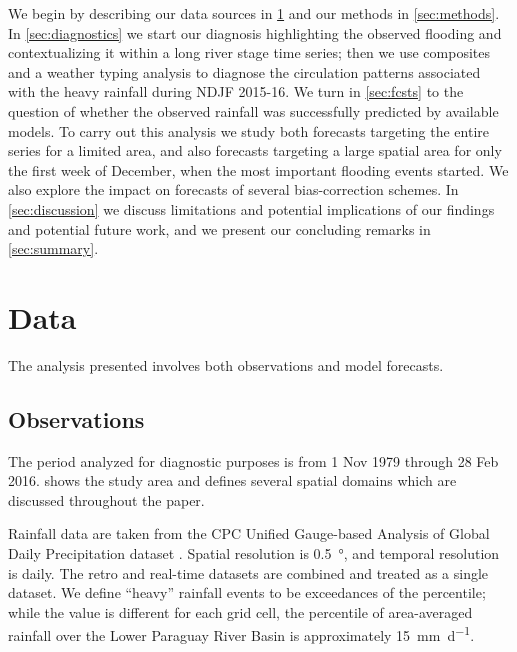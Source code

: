 \documentclass[twocol]{ametsoc}
\begin{document}
We begin by describing our data sources in \cref{sec:data} and our methods in \cref{sec:methods}.
In \cref{sec:diagnostics} we start our diagnosis highlighting the observed flooding and contextualizing it within a long river stage time series; then we use composites and a weather typing analysis to diagnose the circulation patterns associated with the heavy rainfall during NDJF 2015-16. We turn in \cref{sec:fcsts} to the question of whether the observed rainfall was successfully predicted by available models.
To carry out this analysis we study both forecasts targeting the entire series for a limited area, and also forecasts targeting a large spatial area for only the first week of December, when the most important flooding events started.
We also explore the impact on forecasts of several bias-correction schemes.
In \cref{sec:discussion} we discuss limitations and potential implications of our findings and potential future work, and we present our concluding remarks in \cref{sec:summary}.


\section{Data} \label{sec:data}

The analysis presented involves both observations and model forecasts.

\subsection{Observations}

The period analyzed for diagnostic purposes is from 1 Nov 1979 through 28 Feb 2016.
 shows the study area and defines several spatial domains which are discussed throughout the paper.

Rainfall data are taken from the CPC Unified Gauge-based Analysis of Global Daily Precipitation dataset \citep{xie2010cpc}.
Spatial resolution is \SI{0.5}{\degree}, and temporal resolution is daily.
The retro and real-time datasets are combined and treated as a single dataset.
We define ``heavy'' rainfall events to be exceedances of the  percentile; while the value is different for each grid cell, the  percentile of area-averaged rainfall over the Lower Paraguay River Basin is approximately \SI{15}{\milli\meter\per\day}.
\end{document}
